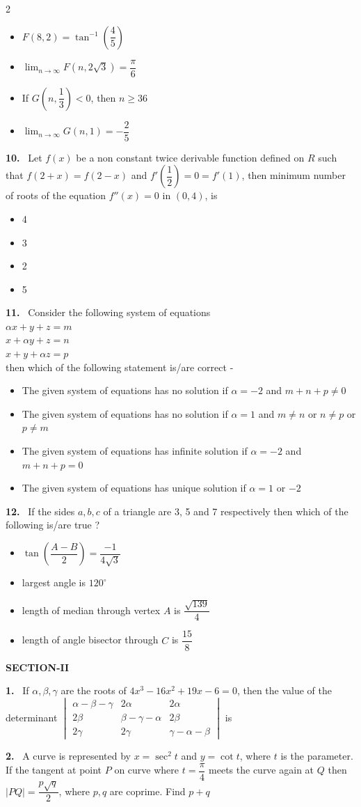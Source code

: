 \documentclass[10pt]{extarticle}
\newcommand{\sect}[1]{\par\smallskip\noindent\textbf{#1}\par}
\newcommand{\qn}[1]{\par\smallskip\noindent\textbf{#1.}~}
\newenvironment{qoptions}{\begin{itemize}[leftmargin=1.8em,itemsep=1pt,topsep=2pt,label={}]}{\end{itemize}}
\newcommand{\opt}[2]{\item[(#1)] #2}
\begin{document}
\begin{multicols}{2}
\begin{qoptions}
\opt{A}{$F(8,2)=\tan^{-1}\left(\dfrac45\right)$}
\opt{B}{$\displaystyle\lim_{n\to\infty}F\left(n,2\sqrt3\right)=\dfrac\pi6$}
\opt{C}{If $G\left(n,\dfrac13\right)<0$, then $n\geq36$}
\opt{D}{$\displaystyle\lim_{n\to\infty}G(n,1)=-\dfrac25$}
\end{qoptions}
\qn{10} Let $f(x)$ be a non constant twice derivable function defined on $R$ such that $f(2+x)=f(2-x)$ and $f'\left(\dfrac12\right)=0=f'(1)$, then minimum number of roots of the equation $f''(x)=0$ in $(0,4)$, is
\begin{qoptions}
\opt{A}{4}
\opt{B}{3}
\opt{C}{2}
\opt{D}{5}
\end{qoptions}
\qn{11} Consider the following system of equations\\
$\alpha x+y+z=m$\\
$x+\alpha y+z=n$\\
$x+y+\alpha z=p$\\
then which of the following statement is/are correct -
\begin{qoptions}
\opt{A}{The given system of equations has no solution if $\alpha=-2$ and $m+n+p\neq0$}
\opt{B}{The given system of equations has no solution if $\alpha=1$ and $m\neq n$ or $n\neq p$ or $p\neq m$}
\opt{C}{The given system of equations has infinite solution if $\alpha=-2$ and $m+n+p=0$}
\opt{D}{The given system of equations has unique solution if $\alpha=1$ or $-2$}
\end{qoptions}
\qn{12} If the sides $a,b,c$ of a triangle are 3, 5 and 7 respectively then which of the following is/are true ?
\begin{qoptions}
\opt{A}{$\tan\left(\dfrac{A-B}{2}\right)=\dfrac{-1}{4\sqrt3}$}
\opt{B}{largest angle is $120^\circ$}
\opt{C}{length of median through vertex $A$ is $\dfrac{\sqrt{139}}{4}$}
\opt{D}{length of angle bisector through $C$ is $\dfrac{15}{8}$}
\end{qoptions}
\sect{SECTION-II}
\qn{1} If $\alpha,\beta,\gamma$ are the roots of $4x^3-16x^2+19x-6=0$, then the value of the determinant $\begin{vmatrix}\alpha-\beta-\gamma&2\alpha&2\alpha\\2\beta&\beta-\gamma-\alpha&2\beta\\2\gamma&2\gamma&\gamma-\alpha-\beta\end{vmatrix}$ is
\qn{2} A curve is represented by $x=\sec^2t$ and $y=\cot t$, where $t$ is the parameter. If the tangent at point $P$ on curve where $t=\dfrac\pi4$ meets the curve again at $Q$ then $|PQ|=\dfrac{p\sqrt q}{2}$, where $p,q$ are coprime. Find $p+q$

\end{multicols}
\end{document}
